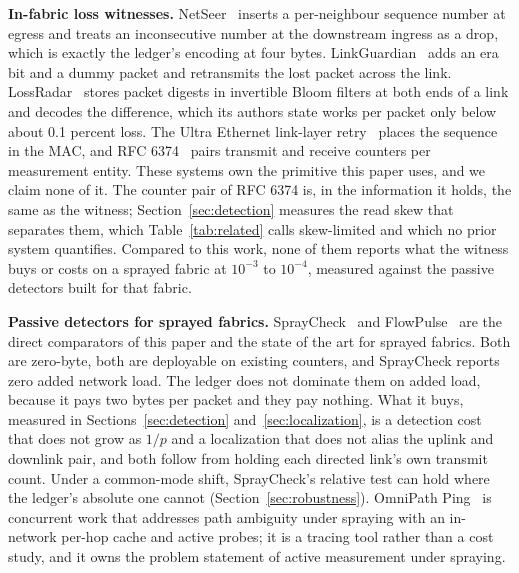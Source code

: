 \textbf{In-fabric loss witnesses.} NetSeer~\cite{netseer} inserts a per-neighbour sequence number at egress and treats an inconsecutive number at the downstream ingress as a drop, which is exactly the ledger's encoding at four bytes. LinkGuardian~\cite{linkguardian} adds an era bit and a dummy packet and retransmits the lost packet across the link. LossRadar~\cite{lossradar} stores packet digests in invertible Bloom filters at both ends of a link and decodes the difference, which its authors state works per packet only below about 0.1 percent loss. The Ultra Ethernet link-layer retry~\cite{uec} places the sequence in the MAC, and RFC 6374~\cite{rfc6374} pairs transmit and receive counters per measurement entity. These systems own the primitive this paper uses, and we claim none of it. The counter pair of RFC 6374 is, in the information it holds, the same as the witness; Section~\ref{sec:detection} measures the read skew that separates them, which Table~\ref{tab:related} calls skew-limited and which no prior system quantifies. Compared to this work, none of them reports what the witness buys or costs on a sprayed fabric at $10^{-3}$ to $10^{-4}$, measured against the passive detectors built for that fabric.

\textbf{Passive detectors for sprayed fabrics.} SprayCheck~\cite{spraycheck} and FlowPulse~\cite{flowpulse} are the direct comparators of this paper and the state of the art for sprayed fabrics. Both are zero-byte, both are deployable on existing counters, and SprayCheck reports zero added network load. The ledger does not dominate them on added load, because it pays two bytes per packet and they pay nothing. What it buys, measured in Sections~\ref{sec:detection} and~\ref{sec:localization}, is a detection cost that does not grow as $1/p$ and a localization that does not alias the uplink and downlink pair, and both follow from holding each directed link's own transmit count. Under a common-mode shift, SprayCheck's relative test can hold where the ledger's absolute one cannot (Section~\ref{sec:robustness}). OmniPath Ping~\cite{omnipath} is concurrent work that addresses path ambiguity under spraying with an in-network per-hop cache and active probes; it is a tracing tool rather than a cost study, and it owns the problem statement of active measurement under spraying.


